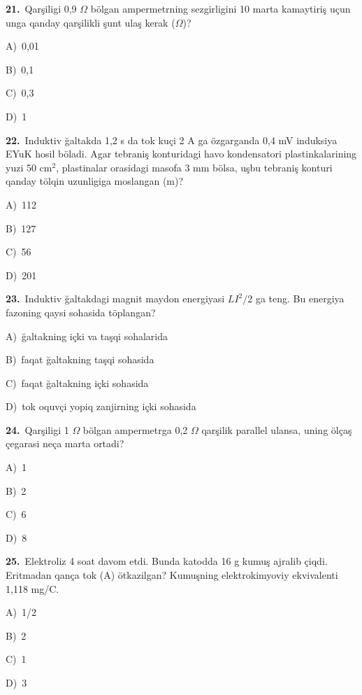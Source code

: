 \documentclass[11pt,a4paper]{article}
\newcommand{\opt}[2]{\hspace*{4mm}#1)\ #2\par}
\begin{document}
\noindent\begin{minipage}{\linewidth}
\textbf{21.}\ Qarşiligi 0,9 $\Omega$ bölgan ampermetrning sezgirligini 10 marta kamaytiriş uçun unga qanday qarşilikli şunt ulaş kerak ($\Omega$)?\par\smallskip
\opt{A}{0,01}
\opt{B}{0,1}
\opt{C}{0,3}
\opt{D}{1}
\end{minipage}\vspace{9pt}\par
\noindent\begin{minipage}{\linewidth}
\textbf{22.}\ Induktiv ğaltakda 1,2 s da tok kuçi 2 A ga özgarganda 0,4 mV induksiya EYuK hosil böladi. Agar tebraniş konturidagi havo kondensatori plastinkalarining yuzi 50 cm$^{2}$, plastinalar orasidagi masofa 3 mm bölsa, uşbu tebraniş konturi qanday tölqin uzunligiga moslangan (m)?\par\smallskip
\opt{A}{112}
\opt{B}{127}
\opt{C}{56}
\opt{D}{201}
\end{minipage}\vspace{9pt}\par
\noindent\begin{minipage}{\linewidth}
\textbf{23.}\ Induktiv ğaltakdagi magnit maydon energiyasi $LI^2/2$ ga teng. Bu energiya fazoning qaysi sohasida töplangan?\par\smallskip
\opt{A}{ğaltakning içki va taşqi sohalarida}
\opt{B}{faqat ğaltakning taşqi sohasida}
\opt{C}{faqat ğaltakning içki sohasida}
\opt{D}{tok oquvçi yopiq zanjirning içki sohasida}
\end{minipage}\vspace{9pt}\par
\noindent\begin{minipage}{\linewidth}
\textbf{24.}\ Qarşiligi 1 $\Omega$ bölgan ampermetrga 0,2 $\Omega$ qarşilik parallel ulansa, uning ölçaş çegarasi neça marta ortadi?\par\smallskip
\opt{A}{1}
\opt{B}{2}
\opt{C}{6}
\opt{D}{8}
\end{minipage}\vspace{9pt}\par
\noindent\begin{minipage}{\linewidth}
\textbf{25.}\ Elektroliz 4 soat davom etdi. Bunda katodda 16 g kumuş ajralib çiqdi. Eritmadan qança tok (A) ötkazilgan? Kumuşning elektrokimyoviy ekvivalenti 1,118 mg/C.\par\smallskip
\opt{A}{1/2}
\opt{B}{2}
\opt{C}{1}
\opt{D}{3}
\end{minipage}\vspace{9pt}\par
\end{document}
